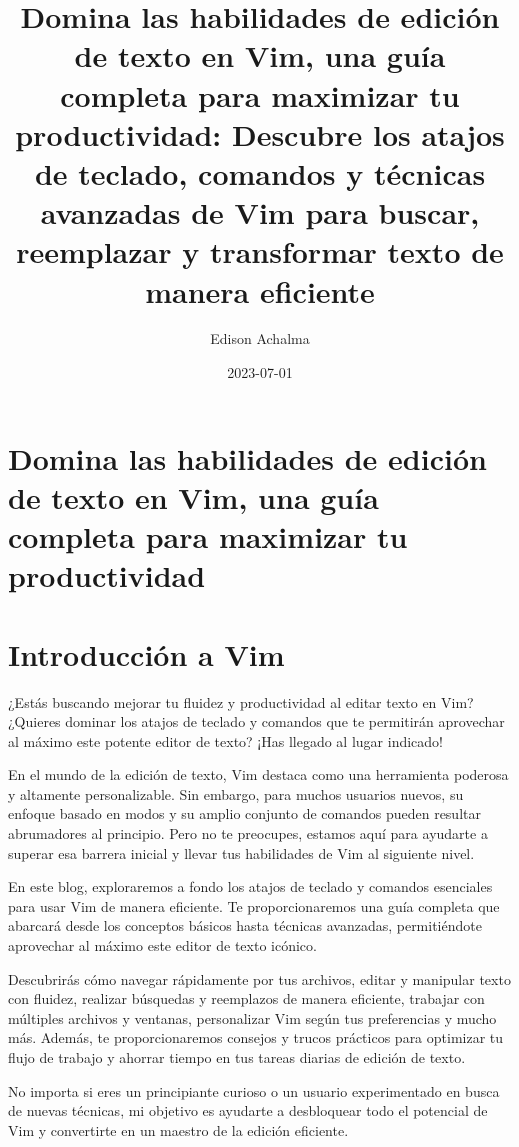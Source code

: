 \documentclass[
  doc,
  floatsintext,
  longtable,
  a4paper,
  nolmodern,
  notxfonts,
  notimes,
  colorlinks=true,linkcolor=blue,citecolor=blue,urlcolor=blue]{apa7}
\title{Domina las habilidades de edición de texto en Vim, una guía
completa para maximizar tu productividad: Descubre los atajos de
teclado, comandos y técnicas avanzadas de Vim para buscar, reemplazar y
transformar texto de manera eficiente}
\author{Edison Achalma}
\affiliation{
{Escuela Profesional de Economía, Universidad Nacional de San Cristóbal
de Huamanga}}
\date{2023-07-01}
\begin{document}
\maketitle

\hypertarget{toc}{}
\tableofcontents
\newpage
\section[Introduction]{Domina las habilidades de edición de texto en
Vim, una guía completa para maximizar tu productividad}

\setcounter{secnumdepth}{5}

\setlength\LTleft{0pt}


\section{Introducción a Vim}\label{introducciuxf3n-a-vim}

¿Estás buscando mejorar tu fluidez y productividad al editar texto en
Vim? ¿Quieres dominar los atajos de teclado y comandos que te permitirán
aprovechar al máximo este potente editor de texto? ¡Has llegado al lugar
indicado!

En el mundo de la edición de texto, Vim destaca como una herramienta
poderosa y altamente personalizable. Sin embargo, para muchos usuarios
nuevos, su enfoque basado en modos y su amplio conjunto de comandos
pueden resultar abrumadores al principio. Pero no te preocupes, estamos
aquí para ayudarte a superar esa barrera inicial y llevar tus
habilidades de Vim al siguiente nivel.

En este blog, exploraremos a fondo los atajos de teclado y comandos
esenciales para usar Vim de manera eficiente. Te proporcionaremos una
guía completa que abarcará desde los conceptos básicos hasta técnicas
avanzadas, permitiéndote aprovechar al máximo este editor de texto
icónico.

Descubrirás cómo navegar rápidamente por tus archivos, editar y
manipular texto con fluidez, realizar búsquedas y reemplazos de manera
eficiente, trabajar con múltiples archivos y ventanas, personalizar Vim
según tus preferencias y mucho más. Además, te proporcionaremos consejos
y trucos prácticos para optimizar tu flujo de trabajo y ahorrar tiempo
en tus tareas diarias de edición de texto.

No importa si eres un principiante curioso o un usuario experimentado en
busca de nuevas técnicas, mi objetivo es ayudarte a desbloquear todo el
potencial de Vim y convertirte en un maestro de la edición eficiente.
\end{document}
